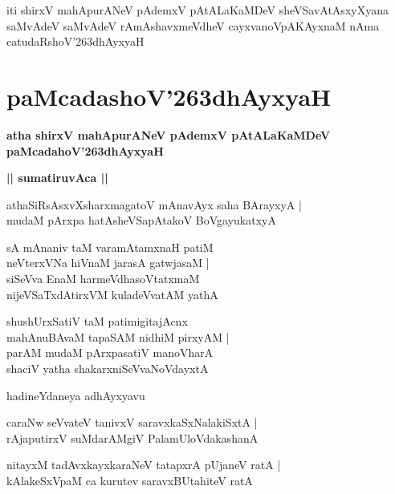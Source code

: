 \documentclass[twoside,12pt,openright]{book}
\def\S{\char'263}
\newcounter{shloka}[chapter]
\def\uvaca#1{\centerline{{\large\textbf{#1}}}}
\begin{document}
\begin{center}
iti shirxV mahApurANeV pAdemxV pAtALaKaMDeV sheVSavAtAsxyXyana saMvAdeV 
saMvAdeV rAmAshavxmeVdheV cayxvanoVpAKAyxnaM nAma catudaRshoV\S dhAyxyaH
\end{center}

\chapter{paMcadashoV\S dhAyxyaH}

\begin{center}
{\LARGE\bfseries atha shirxV mahApurANeV pAdemxV pAtALaKaMDeV paMcadahoV\S dhAyxyaH}
\end{center}

\uvaca{|| sumatiruvAca ||}

\begin{shloka}%
athaSiRsAsxvXsharxmagatoV mAnavAyx saha BArayxyA |\\
mudaM pArxpa hatAsheVSapAtakoV BoVgayukatxyA 
\end{shloka}

\begin{shloka}%
sA mAnaniv taM varamAtamxnaH patiM\\
neVterxVNa hiVnaM jarasA gatwjasaM |\\
siSeVva EnaM harmeVdhasoVtatxmaM \\
nijeVSaTxdAtirxVM kuladeVvatAM yathA 
\end{shloka}

\begin{shloka}%
shushUrxSatiV taM patimigitajAcnx\\
mahAnuBAvaM tapaSAM nidhiM pirxyAM |\\
parAM mudaM pArxpasatiV manoVharA \\
shaciV yatha shakarxniSeVvaNoVdayxtA 
\end{shloka}

\begin{center}
hadineYdaneya adhAyxyavu
\end{center}

\begin{shloka}%
caraNw seVvateV tanivxV saravxkaSxNalakiSxtA |\\
rAjaputirxV suMdarAMgiV PalamUloVdakashanA 
\end{shloka}

\begin{shloka}%
nitayxM tadAvxkayxkaraNeV tatapxrA pUjaneV ratA |\\
kAlakeSxVpaM ca kurutev saravxBUtahiteV ratA 
\end{shloka}
\end{document}

